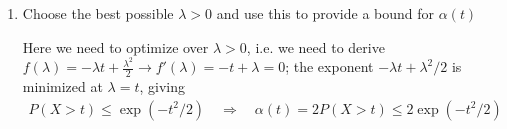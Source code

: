 \documentclass[10pt]{article}
\begin{document}
\begin{enumerate}[label=(\roman*)]
\begin{enumerate}[label=(\alph*)]
        We apply Markov to the nonnegative r.v. $Y = \exp(\lambda X)$:
        \begin{gather*}
            P(X > t) = P\big(\exp(\lambda X) > \exp(\lambda t)\big) \le \frac{\mathbb{E}[\exp(\lambda X)]}{\exp(\lambda t)} = M_X(\lambda)\exp(-\lambda t).
        \end{gather*}
        The MGF of $\mathcal{N}(0,1)$ \cite[Appendix A, \textsc{Proposition 2}]{appendix} is 
        \begin{gather*}
            M_X(\lambda) = \exp(\lambda^2 / 2).
        \end{gather*}
        Hence, 
        \begin{gather*}
            P(X > t) \le \exp\left(-\lambda t + \frac{\lambda^2}{2}\right)
        \end{gather*}
        \item Choose the best possible $\lambda > 0 $ and use this to provide a bound for $\alpha(t)$
        
        Here we need to optimize over $\lambda > 0$, i.e. we need to derive $f(\lambda) = -\lambda t + \frac{\lambda^2}{2} \to f'(\lambda) = -t + \lambda = 0 $; the exponent $-\lambda t + \lambda^2 / 2 $ is minimized at $\lambda = t $, giving
        \begin{gather*}
            P(X > t) \le \exp(-t^2 / 2) \quad\Rightarrow\quad\alpha(t) = 2P(X > t) \le 2\exp(-t^2 / 2)
        \end{gather*}


\end{enumerate}
\end{enumerate}
\end{document}
